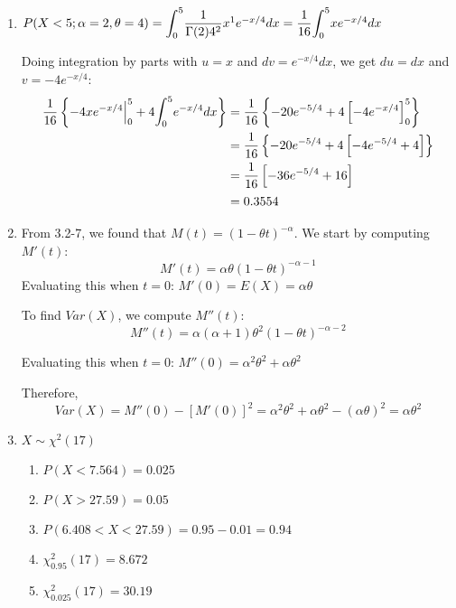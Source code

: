 \documentclass{article}
\begin{document}
\begin{enumerate}
     \item
      $P(X < 5; \alpha = 2, \theta = 4) = \mathlarger{\int}_0^5{\dfrac{1}{\Gamma(2)4^2}x^1 e^{-x/4}dx} 
	= \dfrac{1}{16}\mathlarger{\int}_0^5 {xe^{-x/4}dx}$
      
      Doing integration by parts with $u = x$ and $dv = e^{-x/4}dx$, we get $du = dx$ and 
      $v = -4e^{-x/4}$:      
	\begin{align*}
	  \dfrac{1}{16}\left\{-4xe^{-x/4} \Big|_0^5 + 4 \mathlarger{\int}_0^5 {e^{-x/4}dx}\right\}
	    &= \dfrac{1}{16}\left\{-20e^{-5/4} + 4 \left[-4e^{-x/4}\right]_0^5\right\} \\
	    &= \dfrac{1}{16}\left\{-20e^{-5/4} + 4\left[-4e^{-5/4} + 4\right]\right\} \\
	    &= \dfrac{1}{16} \left[-36e^{-5/4} + 16 \right] \\
	    &= 0.3554
	\end{align*}
     \addtocounter{enumi}{1}
     
     \item
      From 3.2-7, we found that $M(t) = (1-\theta t)^{-\alpha}$. We start by computing $M'(t)$:
	$$M'(t) = \alpha\theta(1-\theta t)^{-\alpha-1}$$
      Evaluating this when $t=0$: $M'(0) = E(X) = \alpha\theta$
     
      To find $Var(X)$, we compute $M''(t)$:
	$$M''(t) = \alpha(\alpha+1)\theta^2(1-\theta t)^{-\alpha -2}$$
	
      Evaluating this when $t=0$: $M''(0) = \alpha^2\theta^2 + \alpha\theta^2$
      
      Therefore, 
	$$Var(X) = M''(0) - [M'(0)]^2 = \alpha^2\theta^2 + \alpha\theta^2 - (\alpha\theta)^2 = 
	  \alpha\theta^2$$	

     \item
      $X \sim \chi^2(17)$
      \begin{enumerate}
       \item 
	$P(X < 7.564) = 0.025$
       
       \item
	$P(X > 27.59) = 0.05$
	
       \item
	$P(6.408 < X < 27.59) = 0.95 - 0.01 = 0.94$
       
       \item
	$\chi_{0.95}^2(17) = 8.672$
       
       \item
	$\chi_{0.025}^2(17) = 30.19$
      \end{enumerate}
     

\end{enumerate}
\end{document}
